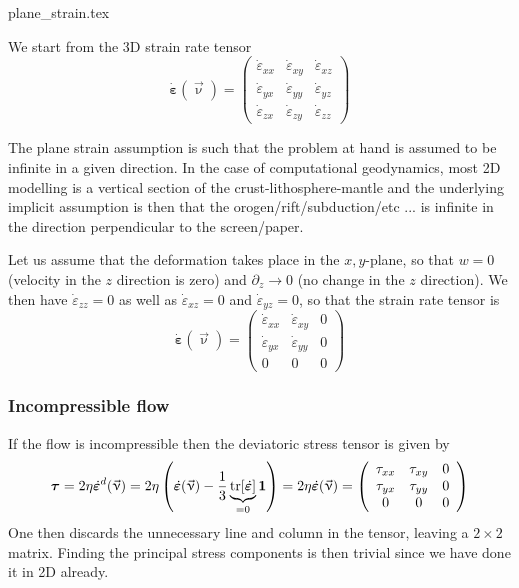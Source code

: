 \begin{flushright} {\tiny {\color{gray} plane\_strain.tex}} \end{flushright}

We start from the 3D strain rate tensor 
\[
\dot{\bm \varepsilon}(\vec\upnu) = 
\left(
\begin{array}{ccc}
\dot{\varepsilon}_{xx} & \dot{\varepsilon}_{xy} & \dot{\varepsilon}_{xz} \\
\dot{\varepsilon}_{yx} & \dot{\varepsilon}_{yy} & \dot{\varepsilon}_{yz} \\
\dot{\varepsilon}_{zx} & \dot{\varepsilon}_{zy} & \dot{\varepsilon}_{zz} 
\end{array}
\right)
\]

The plane strain assumption is such that the problem at hand is assumed to be 
infinite in a given direction. In the case of computational geodynamics, most 2D 
modelling is a vertical section of the crust-lithosphere-mantle
and the underlying implicit assumption is then that the orogen/rift/subduction/etc ... 
is infinite in the direction perpendicular to the screen/paper.  

Let us assume that the deformation takes place in the $x,y$-plane,
so that $w=0$ (velocity in the $z$ direction is zero) and $\partial_z \rightarrow 0$ 
(no change in the $z$ direction).
We then have $\dot{\varepsilon}_{zz}=0$ as well as $\dot{\varepsilon}_{xz}=0$ 
and $\dot{\varepsilon}_{yz}=0$, so that the strain rate tensor is 
\[
\dot{\bm \varepsilon}(\vec\upnu)=
\left( \begin{array}{ccc}
\dot{\varepsilon}_{xx} & \dot{\varepsilon}_{xy} & 0 \\
\dot{\varepsilon}_{yx} & \dot{\varepsilon}_{yy} & 0 \\
0 & 0 & 0
\end{array}\right)
\]

\subsubsection{Incompressible flow}

If the flow is incompressible then the deviatoric stress tensor is given by
\[
\bm\tau 
= 2 \eta \dot{\bm \varepsilon}^d(\vec\upnu)
= 2 \eta \left(\dot{\bm \varepsilon}(\vec\upnu) 
-\frac13 \underbrace{{\rm tr}[\dot{\bm \varepsilon}]}_{=0} 
{\bm 1}\right)
= 2 \eta \dot{\bm \varepsilon}(\vec\upnu) 
=
\left(\begin{array}{ccc}
\tau_{xx} & \tau_{xy} & 0 \\
\tau_{yx} & \tau_{yy} & 0 \\
0 & 0 & 0
\end{array}\right)
\]
One then discards the unnecessary line and column in the tensor, leaving a $2\times 2$ matrix.
Finding the principal stress components is then trivial since we have done it in 2D already.



